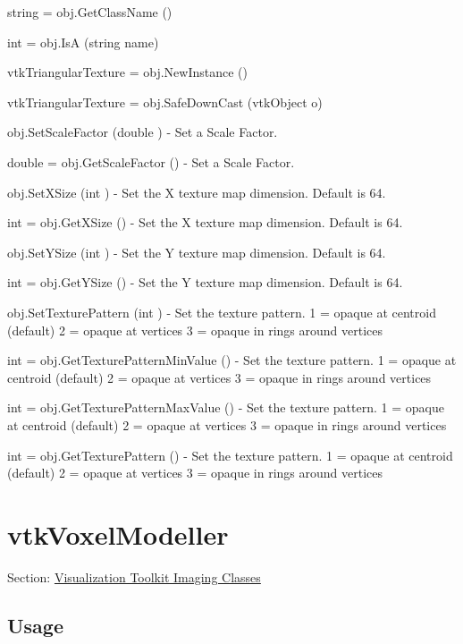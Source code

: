 \begin{DoxyItemize}
\item {\ttfamily string = obj.\-Get\-Class\-Name ()}  
\item {\ttfamily int = obj.\-Is\-A (string name)}  
\item {\ttfamily vtk\-Triangular\-Texture = obj.\-New\-Instance ()}  
\item {\ttfamily vtk\-Triangular\-Texture = obj.\-Safe\-Down\-Cast (vtk\-Object o)}  
\item {\ttfamily obj.\-Set\-Scale\-Factor (double )} -\/ Set a Scale Factor.  
\item {\ttfamily double = obj.\-Get\-Scale\-Factor ()} -\/ Set a Scale Factor.  
\item {\ttfamily obj.\-Set\-X\-Size (int )} -\/ Set the X texture map dimension. Default is 64.  
\item {\ttfamily int = obj.\-Get\-X\-Size ()} -\/ Set the X texture map dimension. Default is 64.  
\item {\ttfamily obj.\-Set\-Y\-Size (int )} -\/ Set the Y texture map dimension. Default is 64.  
\item {\ttfamily int = obj.\-Get\-Y\-Size ()} -\/ Set the Y texture map dimension. Default is 64.  
\item {\ttfamily obj.\-Set\-Texture\-Pattern (int )} -\/ Set the texture pattern. 1 = opaque at centroid (default) 2 = opaque at vertices 3 = opaque in rings around vertices  
\item {\ttfamily int = obj.\-Get\-Texture\-Pattern\-Min\-Value ()} -\/ Set the texture pattern. 1 = opaque at centroid (default) 2 = opaque at vertices 3 = opaque in rings around vertices  
\item {\ttfamily int = obj.\-Get\-Texture\-Pattern\-Max\-Value ()} -\/ Set the texture pattern. 1 = opaque at centroid (default) 2 = opaque at vertices 3 = opaque in rings around vertices  
\item {\ttfamily int = obj.\-Get\-Texture\-Pattern ()} -\/ Set the texture pattern. 1 = opaque at centroid (default) 2 = opaque at vertices 3 = opaque in rings around vertices  
\end{DoxyItemize}\hypertarget{vtkimaging_vtkvoxelmodeller}{}\section{vtk\-Voxel\-Modeller}\label{vtkimaging_vtkvoxelmodeller}
Section\-: \hyperlink{sec_vtkimaging}{Visualization Toolkit Imaging Classes} \hypertarget{vtkwidgets_vtkxyplotwidget_Usage}{}\subsection{Usage}\label{vtkwidgets_vtkxyplotwidget_Usage}

